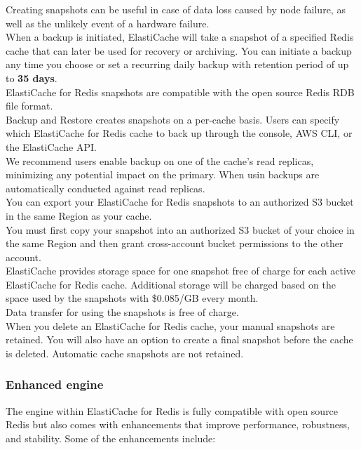 \documentclass[12pt, letterpaper, twoside]{article}
\begin{document}
Creating snapshots can be useful in case of data loss caused by node failure, as well as the unlikely event of a hardware 
failure.\\
When a backup is initiated, ElastiCache will take a snapshot of a specified Redis cache that can later be used for recovery 
or archiving. You can initiate a backup any time you choose or set a recurring daily backup with retention period of up to 
\textbf{35 days}.\\
ElastiCache for Redis snapshots are compatible with the open source Redis RDB file format.\\

Backup and Restore creates snapshots on a per-cache basis. Users can specify which ElastiCache for Redis cache to back up 
through the console, AWS CLI, or the ElastiCache API.\\
We recommend users enable backup on one of the cache’s read replicas, minimizing any potential impact on the primary. 
When usin backups are automatically conducted against read replicas.\\

You can export your ElastiCache for Redis snapshots to an authorized S3 bucket in the same Region as your cache.\\

You must first copy your snapshot into an authorized S3 bucket of your choice in the same Region and then grant 
cross-account bucket permissions to the other account.\\

ElastiCache provides storage space for one snapshot free of charge for each active ElastiCache for Redis cache. 
Additional storage will be charged based on the space used by the snapshots with \$0.085/GB every month.\\
Data transfer for using the snapshots is free of charge.\\

When you delete an ElastiCache for Redis cache, your manual snapshots are retained. You will also have an option 
to create a final snapshot before the cache is deleted. Automatic cache snapshots are not retained.\\

\subsubsection{Enhanced engine}
The engine within ElastiCache for Redis is fully compatible with open source Redis but also comes with enhancements that 
improve performance, robustness, and stability. Some of the enhancements include:
\end{document}
